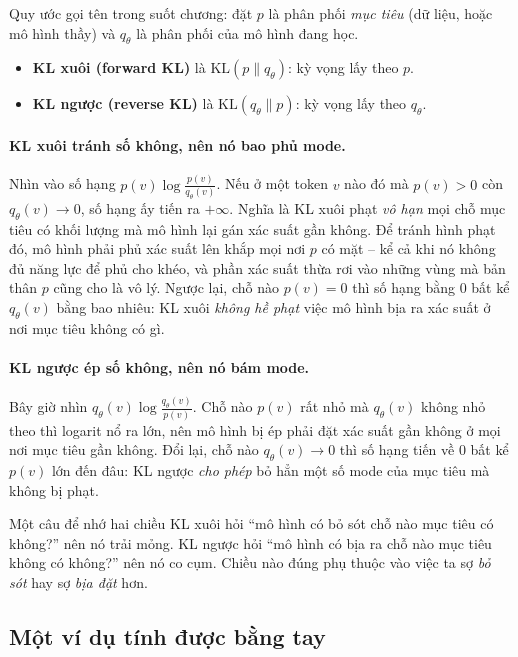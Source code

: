 Quy ước gọi tên trong suốt chương: đặt $p$ là phân phối \emph{mục tiêu} (dữ liệu, hoặc mô hình thầy) và $q_\theta$ là phân phối của mô hình đang học.
\begin{itemize}
	\item \textbf{KL xuôi (forward KL)} là $\mathrm{KL}(p\|q_\theta)$: kỳ vọng lấy theo $p$.
	\item \textbf{KL ngược (reverse KL)} là $\mathrm{KL}(q_\theta\|p)$: kỳ vọng lấy theo $q_\theta$.
\end{itemize}

\paragraph{KL xuôi tránh số không, nên nó bao phủ mode.} Nhìn vào số hạng $p(v)\log\frac{p(v)}{q_\theta(v)}$. Nếu ở một token $v$ nào đó mà $p(v) > 0$ còn $q_\theta(v) \to 0$, số hạng ấy tiến ra $+\infty$. Nghĩa là KL xuôi phạt \emph{vô hạn} mọi chỗ mục tiêu có khối lượng mà mô hình lại gán xác suất gần không. Để tránh hình phạt đó, mô hình phải phủ xác suất lên khắp mọi nơi $p$ có mặt -- kể cả khi nó không đủ năng lực để phủ cho khéo, và phần xác suất thừa rơi vào những vùng mà bản thân $p$ cũng cho là vô lý. Ngược lại, chỗ nào $p(v) = 0$ thì số hạng bằng 0 bất kể $q_\theta(v)$ bằng bao nhiêu: KL xuôi \emph{không hề phạt} việc mô hình bịa ra xác suất ở nơi mục tiêu không có gì.

\paragraph{KL ngược ép số không, nên nó bám mode.} Bây giờ nhìn $q_\theta(v)\log\frac{q_\theta(v)}{p(v)}$. Chỗ nào $p(v)$ rất nhỏ mà $q_\theta(v)$ không nhỏ theo thì logarit nổ ra lớn, nên mô hình bị ép phải đặt xác suất gần không ở mọi nơi mục tiêu gần không. Đổi lại, chỗ nào $q_\theta(v) \to 0$ thì số hạng tiến về 0 bất kể $p(v)$ lớn đến đâu: KL ngược \emph{cho phép} bỏ hẳn một số mode của mục tiêu mà không bị phạt.

\begin{keyidea}{Một câu để nhớ hai chiều}
KL xuôi hỏi ``mô hình có bỏ sót chỗ nào mục tiêu có không?'' nên nó trải mỏng. KL ngược hỏi ``mô hình có bịa ra chỗ nào mục tiêu không có không?'' nên nó co cụm. Chiều nào đúng phụ thuộc vào việc ta sợ \emph{bỏ sót} hay sợ \emph{bịa đặt} hơn.
\end{keyidea}

\subsection{Một ví dụ tính được bằng tay}
\label{ssec:kl_worked_example}

